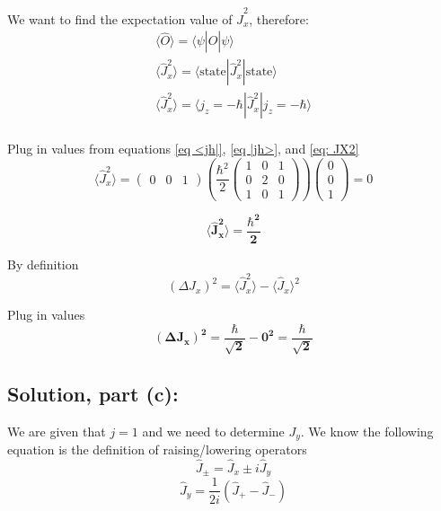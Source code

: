 \documentclass[12pt]{article}
\begin{document}
        We want to find the expectation value of $\hat{J}_x^2$, therefore:
        \begin{align*}
            \langle \hat{O} \rangle = \langle \psi | \hat{O} | \psi \rangle \\
            \langle \hat{J}_x^2 \rangle = \langle \text{state} | \hat{J}_x^2 | \text{state} \rangle \\
            \langle \hat{J}_x^2 \rangle = \langle j_z = - \hbar | \hat{J}_x^2 | j_z = -\hbar \rangle \\
        \end{align*}

        Plug in values from equations \ref{eq <jh|}, \ref{eq |jh>}, and \ref{eq: JX2}
        \[
            \langle \hat{J}_x^2 \rangle = \begin{pmatrix}
                0 & 0 & 1
            \end{pmatrix} \left( \frac{\hbar^2}{2} \begin{pmatrix}
                1 & 0 & 1 \\
                0 & 2 & 0 \\
                1 & 0 & 1
            \end{pmatrix} \right) \begin{pmatrix}
                0 \\ 0 \\ 1
            \end{pmatrix} = 0
        \]

        \[
            \boldsymbol{\boxed{\langle \hat{J}_x^2 \rangle = \frac{\hbar^2}{2}}}
        \]

        By definition
        \[
            \left( \Delta J_x \right)^2 = \langle \hat{J}_x^2 \rangle - \langle \hat{J}_x \rangle^2
        \]

        Plug in values 
        \[
            \boldsymbol{\boxed{\left( \Delta J_x \right)^2 = \frac{\hbar}{\sqrt{2}} - 0^2 = \frac{\hbar}{\sqrt{2}}}}
        \]

    \subsection{Solution, part (c):}


        We are given that $j = 1$ and we need to determine $J_y$. We know the following equation is the definition of raising/lowering operators
        \[
            \hat{J}_\pm = \hat{J}_x \pm i \hat{J}_y
        \]
        \begin{equation} \label{eq: jy}
            \hat{J}_y = \frac{1}{2i} (\hat{J}_+ - \hat{J}_-)
        \end{equation}
\end{document}
